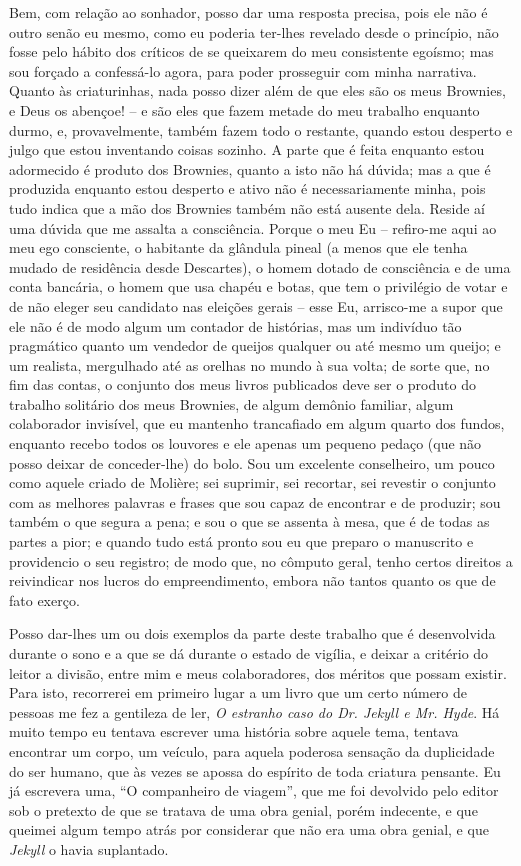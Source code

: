 Bem, com relação ao sonhador, posso dar uma resposta precisa, pois ele
não é outro senão eu mesmo, como eu poderia ter-lhes revelado desde o
princípio, não fosse pelo hábito dos críticos de se queixarem do meu
consistente egoísmo; mas sou forçado a confessá-lo agora, para poder
prosseguir com minha narrativa.  Quanto às criaturinhas, nada posso
dizer além de que eles são os meus Brownies, e Deus os abençoe! -- e
são eles que fazem metade do meu trabalho enquanto durmo, e,
provavelmente, também fazem todo o restante, quando estou desperto e
julgo que estou inventando coisas sozinho.  A parte que é feita
enquanto estou adormecido é produto dos Brownies, quanto a isto não há
dúvida; mas a que é produzida enquanto estou desperto e ativo não é
necessariamente minha, pois tudo indica que a mão dos Brownies também
não está ausente dela.  Reside aí uma dúvida que me assalta a
consciência.  Porque o meu Eu -- refiro-me aqui ao meu ego consciente, o
habitante da glândula pineal (a menos que ele tenha mudado de
residência desde Descartes), o homem dotado de consciência e de uma
conta bancária, o homem que usa chapéu e botas, que tem o privilégio de
votar e de não eleger seu candidato nas eleições gerais -- esse Eu,
arrisco-me a supor que ele não é de modo algum um contador de
histórias, mas um indivíduo tão pragmático quanto um vendedor de
queijos qualquer ou até mesmo um queijo; e um realista, mergulhado até
as orelhas no mundo à sua volta; de sorte que, no fim das contas, o
conjunto dos meus livros publicados deve ser o produto do trabalho
solitário dos meus Brownies, de algum demônio familiar, algum
colaborador invisível, que eu mantenho trancafiado em algum quarto dos
fundos, enquanto recebo todos os louvores e ele apenas um pequeno
pedaço (que não posso deixar de conceder-lhe) do bolo.  Sou um
excelente conselheiro, um pouco como aquele criado de Molière; sei
suprimir, sei recortar, sei revestir o conjunto com as melhores
palavras e frases que sou capaz de encontrar e de produzir; sou também
o que segura a pena; e sou o que se assenta à mesa, que é de todas as
partes a pior; e quando tudo está pronto sou eu que preparo o
manuscrito e providencio o seu registro; de modo que, no cômputo geral,
tenho certos direitos a reivindicar nos lucros do empreendimento,
embora não tantos quanto os que de fato exerço.

Posso dar-lhes um ou dois exemplos da parte deste trabalho que é
desenvolvida durante o sono e a que se dá durante o estado de vigília,
e deixar a critério do leitor a divisão, entre mim e meus
colaboradores, dos méritos que possam existir.  Para isto, recorrerei
em primeiro lugar a um livro que um certo número de pessoas me fez a
gentileza de ler, \textit{O estranho caso do Dr. Jekyll e Mr. Hyde}. 
Há muito tempo eu tentava escrever uma história sobre aquele tema,
tentava encontrar um corpo, um veículo, para aquela poderosa sensação
da duplicidade do ser humano, que às vezes se apossa do espírito de
toda criatura pensante.  Eu já escrevera uma, ``O companheiro de
viagem'', que me foi devolvido pelo editor sob o pretexto de que se
tratava de uma obra genial, porém indecente, e que queimei algum tempo
atrás por considerar que não era uma obra genial, e que \textit{Jekyll} o havia
suplantado.

